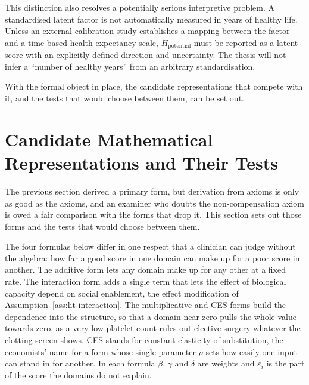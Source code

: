 This distinction also resolves a potentially serious interpretive problem. A standardised latent factor is not automatically measured in years of healthy life. Unless an external calibration study establishes a mapping between the factor and a time-based health-expectancy scale, $H_{\text{potential}}$ must be reported as a latent score with an explicitly defined direction and uncertainty. The thesis will not infer a ``number of healthy years'' from an arbitrary standardisation.

With the formal object in place, the candidate representations that compete with it, and the tests that would choose between them, can be set out.

\section{Candidate Mathematical Representations and Their Tests}
\label{sec:lit-candidates}

The previous section derived a primary form, but derivation from axioms is only as good as the axioms, and an examiner who doubts the non-compensation axiom is owed a fair comparison with the forms that drop it. This section sets out those forms and the tests that would choose between them.

The four formulas below differ in one respect that a clinician can judge without the algebra: how far a good score in one domain can make up for a poor score in another. The additive form lets any domain make up for any other at a fixed rate. The interaction form adds a single term that lets the effect of biological capacity depend on social enablement, the effect modification of Assumption~\ref{ass:lit-interaction}. The multiplicative and CES forms build the dependence into the structure, so that a domain near zero pulls the whole value towards zero, as a very low platelet count rules out elective surgery whatever the clotting screen shows. CES stands for constant elasticity of substitution, the economists' name for a form whose single parameter $\rho$ sets how easily one input can stand in for another. In each formula $\beta$, $\gamma$ and $\delta$ are weights and $\varepsilon_i$ is the part of the score the domains do not explain.

